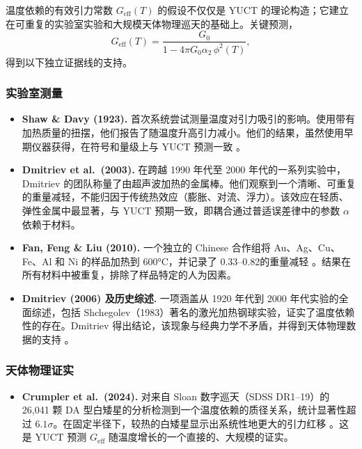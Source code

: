 \documentclass[12pt]{article}
\theoremstyle{remark}
\begin{document}
	温度依赖的有效引力常数 $G_{\mathrm{eff}}(T)$ 的假设不仅仅是 YUCT 的理论构造；它建立在可重复的实验室实验和大规模天体物理巡天的基础上。关键预测，
	\begin{equation}
		G_{\mathrm{eff}}(T) = \frac{G_0}{1 - 4\pi G_0\alpha_2\,\phi^2(T)},
	\end{equation}
	得到以下独立证据线的支持。
	
	\subsubsection*{实验室测量}
	
	\begin{itemize}
		\item \textbf{Shaw \& Davy (1923).} 首次系统尝试测量温度对引力吸引的影响。使用带有加热质量的扭摆，他们报告了随温度升高引力减小。他们的结果，虽然使用早期仪器获得，在符号和量级上与 YUCT 预测一致 \cite{ShawDavy1923}。
		
		\item \textbf{Dmitriev et al.\ (2003).} 在跨越 1990 年代至 2000 年代的一系列实验中，Dmitriev 的团队称量了由超声波加热的金属棒。他们观察到一个清晰、可重复的重量减轻，不能归因于传统热效应（膨胀、对流、浮力）\cite{Dmitriev2003}。该效应在轻质、弹性金属中最显著，与 YUCT 预期一致，即耦合通过普适误差律中的参数 $\alpha$ 依赖于材料。
		
		\item \textbf{Fan, Feng \& Liu (2010).} 一个独立的 Chinese 合作组将 Au、Ag、Cu、Fe、Al 和 Ni 的样品加热到 600°C，并记录了 0.33–0.82\textperthousand 的重量减轻 \cite{Fan2010}。结果在所有材料中被重复，排除了样品特定的人为因素。
		
		\item \textbf{Dmitriev (2006) 及历史综述.} 一项涵盖从 1920 年代到 2000 年代实验的全面综述，包括 Shchegolev（1983）著名的激光加热钢球实验，证实了温度依赖性的存在。Dmitriev 得出结论，该现象与经典力学不矛盾，并得到天体物理数据的支持 \cite{Dmitriev2006}。
	\end{itemize}
	
	\subsubsection*{天体物理证实}
	
	\begin{itemize}
		\item \textbf{Crumpler et al.\ (2024).} 对来自 Sloan 数字巡天（SDSS DR1–19）的 26,041 颗 DA 型白矮星的分析检测到一个温度依赖的质径关系，统计显著性超过 $6.1\sigma$。在固定半径下，较热的白矮星显示出系统性地更大的引力红移 \cite{Crumpler2024}。这是 YUCT 预测 $G_{\mathrm{eff}}$ 随温度增长的一个直接的、大规模的证实。
	\end{itemize}
	
\end{document}
